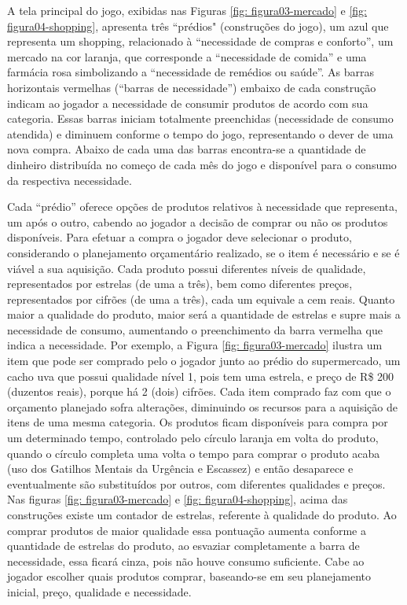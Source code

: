 \newpage
A tela principal do jogo, exibidas nas Figuras \ref{fig: figura03-mercado} e \ref{fig: figura04-shopping}, apresenta três “prédios" (construções do jogo), um azul que representa um shopping, relacionado à “necessidade de compras e conforto”, um mercado na cor laranja, que corresponde a “necessidade de comida” e uma farmácia rosa simbolizando a “necessidade de remédios ou saúde”. As barras horizontais vermelhas (“barras de necessidade”) embaixo de cada construção indicam ao jogador a necessidade de consumir produtos de acordo com sua categoria. Essas barras iniciam totalmente preenchidas (necessidade de consumo atendida) e diminuem conforme o tempo do jogo, representando o dever de uma nova compra. Abaixo de cada uma das barras encontra-se a quantidade de dinheiro distribuída no começo de cada mês do jogo e disponível para o consumo da respectiva necessidade.

Cada “prédio” oferece opções de produtos relativos à necessidade que representa, um após o outro, cabendo ao jogador a decisão de comprar ou não os produtos disponíveis. Para efetuar a compra o jogador deve selecionar o produto, considerando o planejamento orçamentário realizado, se o item é necessário e se é viável a sua aquisição. Cada produto possui diferentes níveis de qualidade, representados por estrelas (de uma a três), bem como diferentes preços, representados por cifrões (de uma a três), cada um equivale a cem reais. Quanto maior a qualidade do produto, maior será a quantidade de estrelas e supre mais a necessidade de consumo, aumentando o preenchimento da barra vermelha que indica a necessidade. Por exemplo, a Figura \ref{fig: figura03-mercado} ilustra um item que pode ser comprado pelo o jogador junto ao prédio do supermercado, um cacho uva que possui qualidade nível 1, pois tem uma estrela, e preço de R{\$} 200 (duzentos reais), porque há 2 (dois) cifrões. Cada item comprado faz com que o orçamento planejado sofra alterações, diminuindo os recursos para a aquisição de itens de uma mesma categoria. Os produtos ficam disponíveis para compra por um determinado tempo, controlado pelo círculo laranja em volta do produto, quando o círculo completa uma volta o tempo para comprar o produto acaba (uso dos Gatilhos Mentais da Urgência e Escassez) e então desaparece e eventualmente são substituídos por outros, com diferentes qualidades e preços. Nas figuras \ref{fig: figura03-mercado} e \ref{fig: figura04-shopping}, acima das construções existe um contador de estrelas, referente à qualidade do produto. Ao comprar produtos de maior qualidade essa pontuação aumenta conforme a quantidade de estrelas do produto, ao esvaziar completamente a barra de necessidade, essa ficará cinza, pois não houve consumo suficiente. Cabe ao jogador escolher quais produtos comprar, baseando-se em seu planejamento inicial, preço, qualidade e necessidade.

